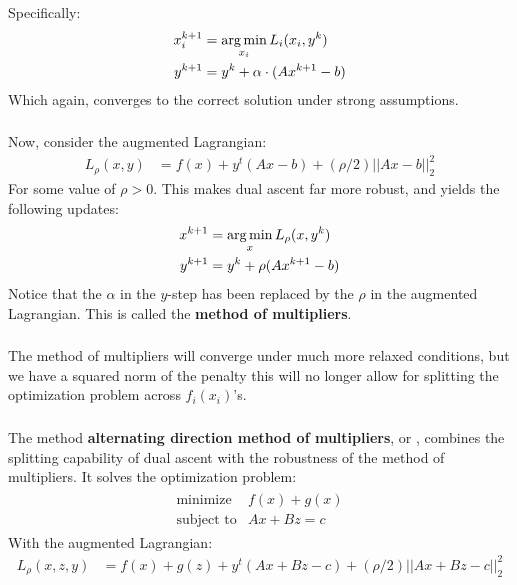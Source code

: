 \begin{frame}[fragile] \frametitle{}

Specifically:
\begin{align*}
x^{k+1}_i &= \mathop{\mathrm{arg\,min}}_{x_i} L_i(x_i, y^k) \\
y^{k+1} &= y^{k} + \alpha \cdot (A x^{k+1} - b)
\end{align*}
Which again, converges to the correct solution under strong assumptions.

\end{frame}

\begin{frame}[fragile] \frametitle{}

Now, consider the augmented Lagrangian:
\begin{align*}
L_\rho (x, y) &= f(x) + y^t (Ax - b) + \left(\rho / 2\right)|| Ax - b ||_2^2
\end{align*}
For some value of $\rho > 0$. This makes dual ascent far more robust, and yields
the following updates:
\begin{align*}
x^{k+1} &= \mathop{\mathrm{arg\,min}}_x L_\rho (x, y^{k}) \\
y^{k+1} &= y^k + \rho (A x^{k+1} - b)
\end{align*}
Notice that the $\alpha$ in the $y$-step has been replaced by the $\rho$
in the augmented Lagrangian. This is called the \textbf{method of multipliers}.

\end{frame}

\begin{frame}[fragile] \frametitle{}

The method of multipliers will converge under much more relaxed conditions, but
we have a squared norm of the penalty this will no longer allow for splitting the
optimization problem across $f_i(x_i)$'s.

\end{frame}

\begin{frame}[fragile] \frametitle{}

The method \textbf{alternating direction method of multipliers}, or ,
combines the splitting capability of dual ascent with the robustness
of the method of multipliers. It solves the optimization problem:
\begin{align*}
\begin{array}{ll}
\text{minimize} & f(x) + g(x) \\
\text{subject to} & Ax + Bz = c
\end{array}
\end{align*}
With the augmented Lagrangian:
\begin{align*}
L_\rho (x, z, y) &= f(x) + g(z) + y^t (Ax + Bz - c) + \left(\rho / 2\right)|| Ax + Bz - c ||_2^2
\end{align*}

\end{frame}

